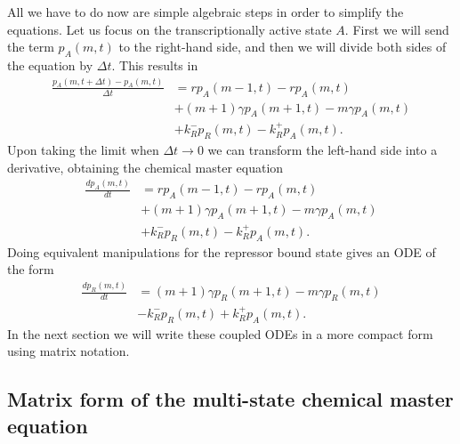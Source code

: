 All we have to do now are simple algebraic steps in order to simplify the 
equations. Let us focus on the transcriptionally active state $A$. First we will
send the term $p_A(m, t)$ to the right-hand side, and then we will divide both
sides of the equation by $\Delta t$. This results in
\begin{equation}
\begin{aligned}
\frac{p_A(m, t + \Delta t) - p_A(m, t)}{\Delta t} &=
r p_A(m-1, t) - r p_A(m, t)\\
&+ (m+1)\gamma p_A(m+1, t)
- m \gamma p_A(m, t)\\
&+k_R^- p_R(m, t)
-k_R^+ p_A(m, t).
\end{aligned}
\end{equation}
Upon taking the limit when $\Delta t \rightarrow 0$ we can transform the 
left-hand side into a derivative, obtaining the chemical master equation
\begin{equation}
\begin{aligned}
\frac{d p_A(m, t)}{dt} &=
r p_A(m-1, t) - r p_A(m, t)\\
&+ (m+1)\gamma p_A(m+1, t)
- m \gamma p_A(m, t)\\
&+k_R^- p_R(m, t)
-k_R^+ p_A(m, t).
\end{aligned}
\end{equation}
Doing equivalent manipulations for the repressor bound state gives an ODE of the
form
\begin{equation}
\begin{aligned}
\frac{d p_R(m, t)}{dt} &=
(m+1)\gamma p_R(m+1, t)
- m \gamma p_R(m, t)\\
&-k_R^- p_R(m, t)
+k_R^+ p_A(m, t).
\end{aligned}
\end{equation}
In the next section we will write these coupled ODEs in a more compact form using
matrix notation.

\subsection{Matrix form of the multi-state chemical master equation}

